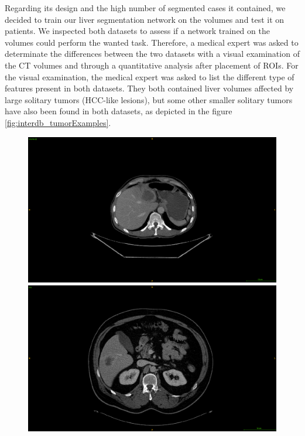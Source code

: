 {
Regarding its design and the high number of segmented cases it contained, we decided to train our liver segmentation network on the \textbf{} volumes and test it on \textbf{} patients.
We inspected both datasets to assess if a network trained on the \textbf{} volumes could perform the wanted task. Therefore, a medical expert was asked to determinate the differences between the two datasets with a visual examination of the CT volumes and through a quantitative analysis after placement of ROIs.
For the visual examination, the medical expert was asked to list the different type of features present in both datasets.
They both contained liver volumes affected by large solitary tumors (HCC-like lesions), but some other smaller solitary tumors have also been found in both datasets, as depicted in the figure \ref{fig:interdb_tumorExamples}. 
\begin{figure}[!ht]
	\begin{mdframed}[backgroundcolor=blue!50,linecolor=blue!50]
		\centering
		\begin{minipage}{6cm}
			\includegraphics[width=\linewidth]{images/Lits_examplePatientSmallTumor_2}
		\end{minipage} \hspace{-0.1cm}
		\begin{minipage}{6cm}
			\includegraphics[width=\linewidth]{images/TCIA_examplePatientSmallTumor}

\end{minipage}
\end{mdframed}
\end{figure}}
